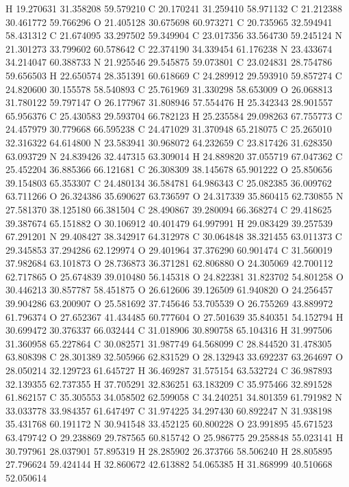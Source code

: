 \documentclass{article}
\begin{document}
H 19.270631 31.358208 59.579210
C 20.170241 31.259410 58.971132
C 21.212388 30.461772 59.766296
O 21.405128 30.675698 60.973271
C 20.735965 32.594941 58.431312
C 21.674095 33.297502 59.349904
C 23.017356 33.564730 59.245124
N 21.301273 33.799602 60.578642
C 22.374190 34.339454 61.176238
N 23.433674 34.214047 60.388733
N 21.925546 29.545875 59.073801
C 23.024831 28.754786 59.656503
H 22.650574 28.351391 60.618669
C 24.289912 29.593910 59.857274
C 24.820600 30.155578 58.540893
C 25.761969 31.330298 58.653009
O 26.068813 31.780122 59.797147
O 26.177967 31.808946 57.554476
H 25.342343 28.901557 65.956376
C 25.430583 29.593704 66.782123
H 25.235584 29.098263 67.755773
C 24.457979 30.779668 66.595238
C 24.471029 31.370948 65.218075
C 25.265010 32.316322 64.614800
N 23.583941 30.968072 64.232659
C 23.817426 31.628350 63.093729
N 24.839426 32.447315 63.309014
H 24.889820 37.055719 67.047362
C 25.452204 36.885366 66.121681
C 26.308309 38.145678 65.901222
O 25.850656 39.154803 65.353307
C 24.480134 36.584781 64.986343
C 25.082385 36.009762 63.711266
O 26.324386 35.690627 63.736597
O 24.317339 35.860415 62.730855
N 27.581370 38.125180 66.381504
C 28.490867 39.280094 66.368274
C 29.418625 39.387674 65.151882
O 30.106912 40.401479 64.997991
H 29.083429 39.257539 67.291201
N 29.408427 38.342917 64.312978
C 30.064848 38.321455 63.011373
C 29.345853 37.294286 62.129974
O 29.401964 37.376290 60.901474
C 31.560019 37.982684 63.101873
O 28.736873 36.371281 62.806880
O 24.305069 42.700112 62.717865
O 25.674839 39.010480 56.145318
O 24.822381 31.823702 54.801258
O 30.446213 30.857787 58.451875
O 26.612606 39.126509 61.940820
O 24.256457 39.904286 63.200907
O 25.581692 37.745646 53.705539
O 26.755269 43.889972 61.796374
O 27.652367 41.434485 60.777604
O 27.501639 35.840351 54.152794
H 30.699472 30.376337 66.032444
C 31.018906 30.890758 65.104316
H 31.997506 31.360958 65.227864
C 30.082571 31.987749 64.568099
C 28.844520 31.478305 63.808398
C 28.301389 32.505966 62.831529
O 28.132943 33.692237 63.264697
O 28.050214 32.129723 61.645727
H 36.469287 31.575154 63.532724
C 36.987893 32.139355 62.737355
H 37.705291 32.836251 63.183209
C 35.975466 32.891528 61.862157
C 35.305553 34.058502 62.599058
C 34.240251 34.801359 61.791982
N 33.033778 33.984357 61.647497
C 31.974225 34.297430 60.892247
N 31.938198 35.431768 60.191172
N 30.941548 33.452125 60.800228
O 23.991895 45.671523 63.479742
O 29.238869 29.787565 60.815742
O 25.986775 29.258848 55.023141
H 30.797961 28.037901 57.895319
H 28.285902 26.373766 58.506240
H 28.805895 27.796624 59.424144
H 32.860672 42.613882 54.065385
H 31.868999 40.510668 52.050614
\end{document}
